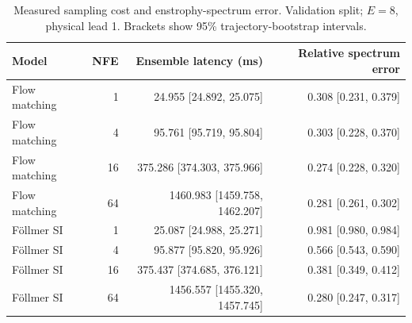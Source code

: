 \begin{table}[t]
\centering
\small
\setlength{\tabcolsep}{3pt}
\caption{Measured sampling cost and enstrophy-spectrum error. Validation split; $E=8$, physical lead 1. Brackets show 95\% trajectory-bootstrap intervals.}
\label{tab:map-cost}
\begin{tabular}{lrrr}
\toprule
Model & NFE & Ensemble latency (ms) & Relative spectrum error \\
\midrule
Flow matching & 1 & 24.955 [24.892, 25.075] & 0.308 [0.231, 0.379] \\
Flow matching & 4 & 95.761 [95.719, 95.804] & 0.303 [0.228, 0.370] \\
Flow matching & 16 & 375.286 [374.303, 375.966] & 0.274 [0.228, 0.320] \\
Flow matching & 64 & 1460.983 [1459.758, 1462.207] & 0.281 [0.261, 0.302] \\
\addlinespace
Föllmer SI & 1 & 25.087 [24.988, 25.271] & 0.981 [0.980, 0.984] \\
Föllmer SI & 4 & 95.877 [95.820, 95.926] & 0.566 [0.543, 0.590] \\
Föllmer SI & 16 & 375.437 [374.685, 376.121] & 0.381 [0.349, 0.412] \\
Föllmer SI & 64 & 1456.557 [1455.320, 1457.745] & 0.280 [0.247, 0.317] \\
\bottomrule
\end{tabular}
\end{table}
